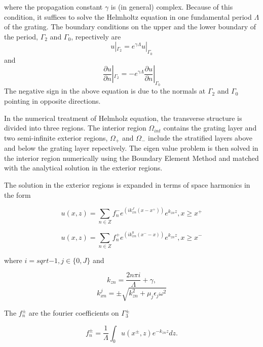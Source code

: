 where the propagation constant $\gamma$ is (in general)
complex. Because of this condition, it suffices to solve the Helmholtz
equation in one fundamental period $\Lambda$ of the grating. The
boundary conditions on the upper and the lower boundary of the period,
$\Gamma_2$ and $\Gamma_0$, repectively are
\[ u|_{\Gamma_2} = e^{\gamma \Lambda} u|_{\Gamma_0} \] and
\[ \frac{\partial u}{\partial n} |_{\Gamma_2} = -e^{\gamma \Lambda}
 \frac{\partial u}{\partial n} |_{\Gamma_0}\]
The negative sign in the above equation is due to the normals at
$\Gamma_2$ and $\Gamma_0$ pointing in opposite directions.

In the numerical treatment of Helmholz equation, the transverse
structure is divided into three regions. The interior region
$\Omega_{int}$ contains the grating layer and two semi-infinite
exterior regions, $\Omega_+$ and $\Omega_-$ include the stratified
layers above and below the grating layer repectively. The eigen value
problem is then solved in the interior region numerically using the
Boundary Element Method and matched with the analytical solution in
the exterior regions.

The solution in the exterior regions is expanded in terms of space
harmonics in the form

\begin{equation}
u(x,z) = \sum_{n \in Z} f_n^- e^{(ik_{xn}^J(x - x^+))} e^{k_{zn}z},
x \geq x^+
\end{equation}

\begin{equation}
u(x,z) = \sum_{n \in Z} f_n^+ e^{(ik_{xn}^0(x^- - x))} e^{k_{zn}z},
x \geq x^-
\end{equation}

where $i = sqrt{-1}, j \in \lbrace 0,J \rbrace$ and 

\[ k_{zn} = \frac{2 n \pi i}{\Lambda} + \gamma, \]
\[ k_{xn}^j = \pm \sqrt{k_{zn}^2 + \mu_j \epsilon_j \omega^2} \]

The $f_n^\pm$ are the fourier coefficients on $\Gamma_3^\pm$

\[ f_n^\pm = \frac{1}{\Lambda}\int_0 u(x^\pm,z) e^{-k_{zn} z} dz. \]

